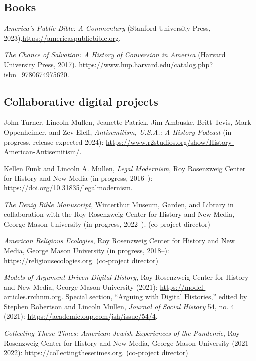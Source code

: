 \documentclass[11pt]{article}
\begin{document}


\subsection{Books}\label{Books}

\emph{America's Public Bible: A Commentary} (Stanford University Press, 2023).\newline\url{https://americaspublicbible.org}.

\emph{The Chance of Salvation: A History of Conversion in America} (Harvard University Press, 2017). \url{https://www.hup.harvard.edu/catalog.php?isbn=9780674975620}.

\subsection{Collaborative digital projects}\label{Digital projects}

John Turner, Lincoln Mullen, Jeanette Patrick, Jim Ambuske, Britt Tevis, Mark Oppenheimer, and Zev Eleff, \emph{Antisemitism, U.S.A.: A History Podcast} (in progress, release expected 2024): \url{https://www.r2studios.org/show/History-American-Antisemitism/}.

Kellen Funk and Lincoln A. Mullen, \emph{Legal Modernism}, Roy Rosenzweig Center for History and New Media (in progress, 2016--): \url{https://doi.org/10.31835/legalmodernism}.

\emph{The Denig Bible Manuscript}, Winterthur Museum, Garden, and Library in collaboration with the Roy Rosenzweig Center for History and New Media, George Mason University (in progress, 2022--). (co-project director)

\emph{American Religious Ecologies}, Roy Rosenzweig Center for History and New Media, George Mason University (in progress, 2018--): \url{https://religiousecologies.org}. (co-project director)

\emph{Models of Argument-Driven Digital History}, Roy Rosenzweig Center for History and New Media, George Mason University (2021): \url{https://model-articles.rrchnm.org}. Special section, ``Arguing with Digital Histories,'' edited by Stephen Robertson and Lincoln Mullen, \emph{Journal of Social History} 54, no. 4 (2021): \url{https://academic.oup.com/jsh/issue/54/4}. 

\emph{Collecting These Times: American Jewish Experiences of the Pandemic}, Roy Rosenzweig Center for History and New Media, George Mason University (2021--2022): \url{https://collectingthesetimes.org}. (co-project director)
\end{document}
